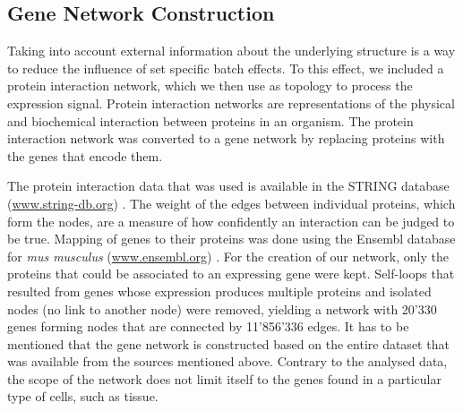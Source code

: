 \documentclass[10pt,conference,compsocconf]{IEEEtran}
\begin{document}
\subsection{Gene Network Construction}
Taking into account external information about the underlying structure is a way to reduce the influence of set specific batch effects. To this effect, we included a protein interaction network, which we then use as topology to process the expression signal. Protein interaction networks are representations of the physical and biochemical interaction between proteins in an organism. The protein interaction network was converted to a gene network by replacing proteins with the genes that encode them. 
\par
The protein interaction data that was used is available in the STRING database (\url{www.string-db.org}) \cite{Szklarczyk2016}. The weight of the edges between individual proteins, which form the nodes, are a measure of how confidently an interaction can be judged to be true. Mapping of genes to their proteins was done using the Ensembl database for \textit{mus musculus} (\url{www.ensembl.org}) \cite{Zerbino2017}. 
For the creation of our network, only the proteins that could be associated to an expressing gene were kept.
Self-loops that resulted from genes whose expression produces multiple proteins and isolated nodes (no link to another node) were removed, yielding a network with 20'330 genes forming nodes that are connected by 11'856'336 edges. It has to be mentioned that the gene network is constructed based on the entire dataset that was available from the sources mentioned above. Contrary to the analysed data, the scope of the network does not limit itself to the genes found in a particular type of cells, such as tissue.  \\
\end{document}
